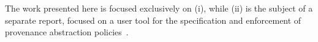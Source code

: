 The work presented here is focused exclusively on (i), while (ii)  is the subject of a separate report, focused on a user tool for the specification and enforcement of provenance abstraction policies~\citep{MBGCD14}.  
%
%






%

